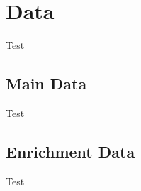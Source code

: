 \section{Data}\label{sec:Data}

Test

\subsection{Main Data}\label{subsec:Main_Data}

Test

\subsection{Enrichment Data}\label{subsec:Enrichment_Data}

Test